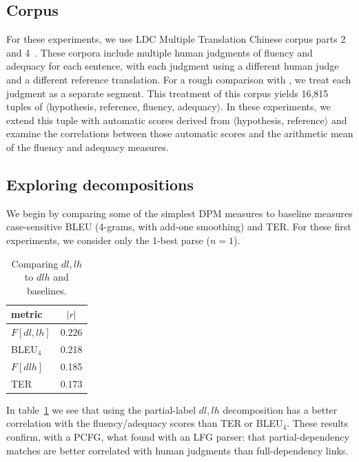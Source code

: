 \documentclass{kluwer}    %
\begin{document}
\begin{article}
\subsection{Corpus}
\label{sec:facorpus}
For these experiments, we use LDC Multiple Translation Chinese corpus
parts 2~\cite{LDC03MTC2} and 4~\cite{LDC06MTC4}.  These corpora
include multiple human judgments of fluency and adequacy for each
sentence, with each judgment using a different human judge and a
different reference translation.  For a rough comparison with , we treat
each judgment as a separate segment.
%
This treatment of this corpus yields 16,815 tuples of
$\langle$hypothesis, reference, fluency, adequacy$\rangle$.  In these
experiments, we extend this tuple with automatic scores derived from
$\langle$hypothesis, reference$\rangle$ and examine the
correlations  between those automatic scores and the arithmetic mean
of the fluency and adequacy measures.

\subsection{Exploring decompositions}
We begin by comparing some of the simplest DPM measures to baseline
measures case-sensitive BLEU (4-grams, with add-one smoothing) and
TER.  For these first experiments, we consider only the 1-best parse
($n=1$).
\begin{table}
  \caption{Comparing $dl,lh$ to $dlh$ and baselines.}
  \label{tab:facorr:subgraphs}
  \begin{tabular*}{2.5in}{lr}
    \hline
    metric  &    \multicolumn{1}{c}{$|r|$} \\
    \hline
    $F[dl,lh]$ &   0.226 \\
    BLEU$_4$ &   0.218 \\
    $F[dlh]$ &     0.185 \\
    TER &      0.173 \\
    \hline
  \end{tabular*}
\end{table}
In table~\ref{tab:facorr:subgraphs} we see that using the
partial-label $dl,lh$ decomposition has a better correlation with the
fluency/adequacy scores than TER or BLEU$_4$.  These results confirm,
with a PCFG, what  found with
an LFG parser: that partial-dependency matches are better correlated
with human judgments than full-dependency links.


\end{article}
\end{document}
